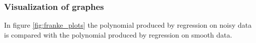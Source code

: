 \subsubsection{Visualization of graphes}
In figure \eqref{fig:franke_plots} the polynomial produced by regression on noisy data is compared with the polynomial produced by regression on smooth data.
\begin{figure} [H]%
    \centering
    \\


\end{figure}
